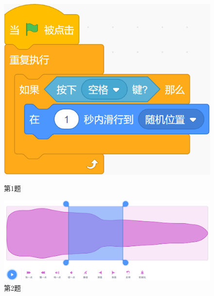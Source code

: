 \documentclass[10pt, a4paper]{article}
\begin{document}
\begin{enumerate}
        \begin{figure}[htbp]
            \centering
            \begin{minipage}[t]{.2\textwidth}
                \centering
                \includegraphics[width=1\textwidth]{1.png}
                \caption*{第1题}
            \end{minipage}
            \begin{minipage}[t]{.45\textwidth}
                \centering
                \includegraphics[width=\textwidth]{2.png}
                \caption*{第2题}
            \end{minipage}
            \begin{minipage}[t]{.18\textwidth}
                \centering

\end{minipage}
\end{figure}
\end{enumerate}
\end{document}
